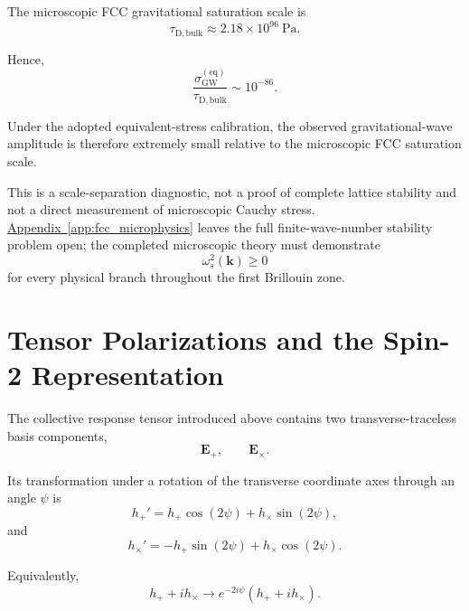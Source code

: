 The microscopic FCC gravitational saturation scale is
\begin{equation}
    \tau_{\mathrm{D,bulk}} \approx 2.18\times10^{96}\ \mathrm{Pa}.
\end{equation}

Hence,
\begin{equation}
    \frac{ \sigma_{\mathrm{GW}}^{(\mathrm{eq})} }{ \tau_{\mathrm{D,bulk}} } \sim 10^{-86}.
\end{equation}

Under the adopted equivalent-stress calibration, the observed gravitational-wave amplitude is therefore extremely small relative to the microscopic FCC saturation scale.

This is a scale-separation diagnostic, not a proof of complete lattice stability and not a direct measurement of microscopic Cauchy stress. \hyperref[app:fcc_microphysics]{Appendix~\ref*{app:fcc_microphysics}} leaves the full finite-wave-number stability problem open; the completed microscopic theory must demonstrate
\begin{equation}
    \omega_s^2(\mathbf{k}) \geq 0
\end{equation}
for every physical branch throughout the first Brillouin zone.

\section{Tensor Polarizations and the Spin-2 Representation}

The collective response tensor introduced above contains two transverse-traceless basis components,
\begin{equation}
    \mathbf{E}_{+}, \qquad \mathbf{E}_{\times}.
\end{equation}

Its transformation under a rotation of the transverse coordinate axes through an angle $\psi$ is
\begin{equation}
    h_{+}' = h_{+}\cos(2\psi) + h_{\times}\sin(2\psi),
\end{equation}
and
\begin{equation}
    h_{\times}' = -h_{+}\sin(2\psi) + h_{\times}\cos(2\psi).
\end{equation}

Equivalently,
\begin{equation}
    h_{+}+ih_{\times} \longrightarrow e^{-2i\psi} \left( h_{+}+ih_{\times} \right).
\end{equation}

